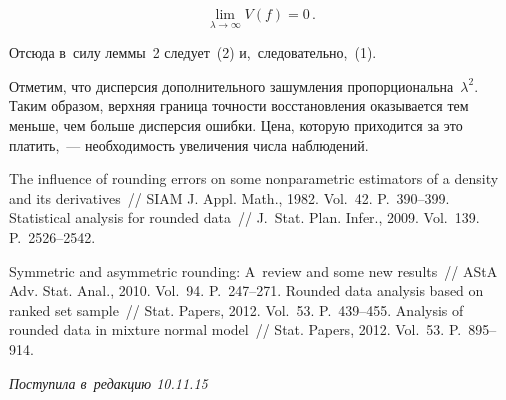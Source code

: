 \begin{multicols}{2}
\noindent
$$
\lim\limits_{\lambda\to\infty} {V}(f)=0\,.
$$

\vspace*{-2pt}

\noindent
Отсюда в~силу леммы~2 следует~(2) и,~следовательно,~(1).


Отметим, что дисперсия дополнительного зашумления пропорциональна~$\lambda^2$.
Таким образом, верхняя граница точности восстановления оказывается тем меньше,
чем больше дисперсия ошибки. Цена, которую приходится за это платить,~---
необходимость увеличения числа наблюдений.

\vspace*{-7pt}

{\small\frenchspacing
 {%
 \begin{thebibliography}{9}
 
 \vspace*{-2pt}
 
 The influence of rounding errors on some nonparametric estimators
of a density and its derivatives~// SIAM J. Appl. Math., 1982.
Vol.~42. P.~390--399.
 Statistical analysis for
rounded data~// J.~Stat. Plan. Infer., 2009. Vol.~139. P.~2526--2542.

 Symmetric and asymmetric rounding:
A~review and some new results~// AStA Adv. Stat. Anal., 2010.
Vol.~94. P.~247--271.
 Rounded data analysis based on ranked
set sample~// Stat. Papers, 2012. Vol.~53. P.~439--455.
 Analysis of rounded data in mixture normal model~//
Stat. Papers, 2012. Vol.~53. P.~895--914.

 \end{thebibliography}

 }
 }

\end{multicols}

\vspace*{-10pt}

\hfill{\small\textit{Поступила в~редакцию 10.11.15}}


\newpage

\vspace*{-24pt}

